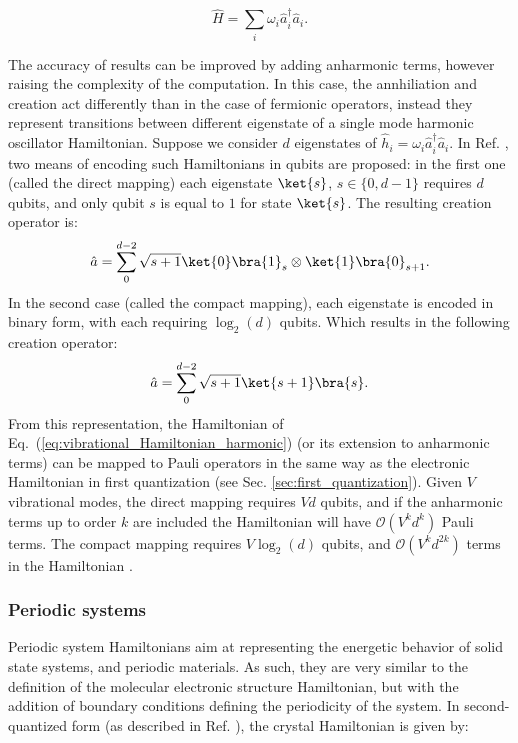 \begin{equation}
\label{eq:vibrational_Hamiltonian_harmonic}
\hat{H} = \sum_i \omega_i \hat{a}^{\dagger}_i \hat{a}_i.
\end{equation}

The accuracy of results can be improved by adding anharmonic terms, however raising the complexity of the computation. In this case, the annhiliation and creation act differently than in the case of fermionic operators, instead they represent transitions between different eigenstate of a single mode harmonic oscillator Hamiltonian. Suppose we consider $d$ eigenstates of $\hat{h}_i = \omega_i \hat{a}^{\dagger}_i \hat{a}_i$. In Ref. \cite{McArdle2019_vibra}, two means of encoding such Hamiltonians in qubits are proposed: in the first one (called the direct mapping) each eigenstate $\ket{s}$, $s \in \{0, d - 1\}$ requires $d$ qubits, and only qubit $s$ is equal to $1$ for state $\ket{s}$. The resulting creation operator is: 
\begin{equation}
\label{eq:vibrational_direct_creation}
\hat{a} = \sum_0^{d - 2} \sqrt{s + 1} \ket{0}\bra{1}_s \otimes \ket{1}\bra{0}_{s + 1}.
\end{equation}
In the second case (called the compact mapping), each eigenstate is encoded in binary form, with each requiring $\log_2(d)$ qubits. Which results in the following creation operator: 
\begin{equation}
\label{eq:vibrational_compact_creation}
\hat{a} = \sum_0^{d - 2} \sqrt{s + 1} \ket{s + 1}\bra{s}.
\end{equation}
From this representation, the Hamiltonian of Eq.~(\ref{eq:vibrational_Hamiltonian_harmonic}) (or its extension to anharmonic terms) can be mapped to Pauli operators in the same way as the electronic Hamiltonian in first quantization (see Sec. \ref{sec:first_quantization}). Given $V$ vibrational modes, the direct mapping requires $Vd$ qubits, and if the anharmonic terms up to order $k$ are included the Hamiltonian will have $\mathcal{O}(V^kd^k)$ Pauli terms. The compact mapping requires $V\log_2(d)$ qubits, and $\mathcal{O}(V^kd^{2k})$ terms in the Hamiltonian \cite{McArdle2019_vibra}. 

\subsubsection{Periodic systems} 

Periodic system Hamiltonians aim at representing the energetic behavior of solid state systems, and periodic materials. As such, they are very similar to the definition of the molecular electronic structure Hamiltonian, but with the addition of boundary conditions defining the periodicity of the system. In second-quantized form (as described in Ref. \cite{Yoshioka2022, Manrique2020}), the crystal Hamiltonian is given by: 

